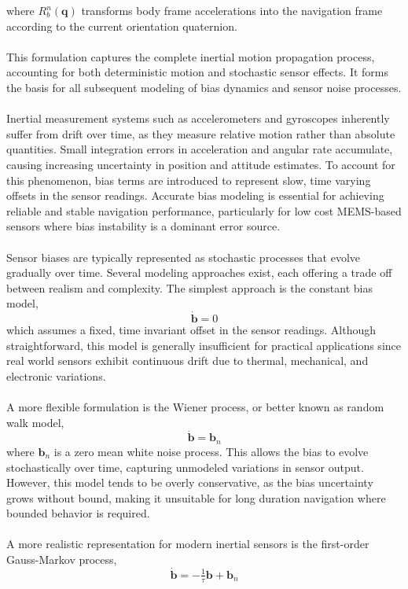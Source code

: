 where $R_b^n(\mathbf{q})$ transforms body frame accelerations into the navigation frame according to the current orientation quaternion.  
\\ \\
This formulation captures the complete inertial motion propagation process, accounting for both deterministic motion and stochastic sensor effects. It forms the basis for all subsequent modeling of bias dynamics and sensor noise processes.
\\ \\
Inertial measurement systems such as accelerometers and gyroscopes inherently suffer from drift over time, as they measure relative motion rather than absolute quantities. Small integration errors in acceleration and angular rate accumulate, causing increasing uncertainty in position and attitude estimates. To account for this phenomenon, bias terms are introduced to represent slow, time varying offsets in the sensor readings. Accurate bias modeling is essential for achieving reliable and stable navigation performance, particularly for low cost MEMS-based sensors where bias instability is a dominant error source.  
\\ \\
Sensor biases are typically represented as stochastic processes that evolve gradually over time. Several modeling approaches exist, each offering a trade off between realism and complexity. The simplest approach is the constant bias model,
$$
    \dot{\mathbf{b}} = 0
$$
which assumes a fixed, time invariant offset in the sensor readings. Although straightforward, this model is generally insufficient for practical applications since real world sensors exhibit continuous drift due to thermal, mechanical, and electronic variations.  
\\ \\
A more flexible formulation is the Wiener process, or better known as random walk model,
$$
    \dot{\mathbf{b}} = \mathbf{b}_n
$$
where $\mathbf{b}_n$ is a zero mean white noise process. This allows the bias to evolve stochastically over time, capturing unmodeled variations in sensor output. However, this model tends to be overly conservative, as the bias uncertainty grows without bound, making it unsuitable for long duration navigation where bounded behavior is required.  
\\ \\
A more realistic representation for modern inertial sensors is the first-order Gauss-Markov process,
$$
    \dot{\mathbf{b}} = -\tfrac{1}{\tau}\mathbf{b} + \mathbf{b}_n
$$
